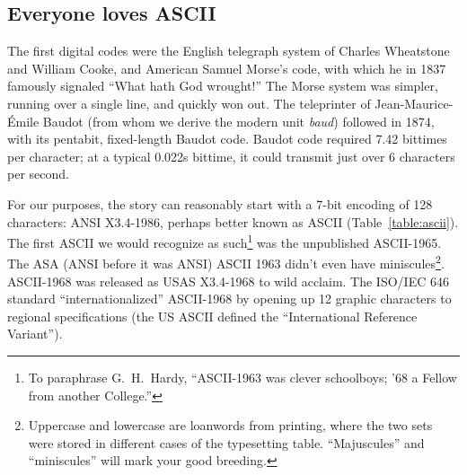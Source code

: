 \subsection{Everyone loves ASCII}
\begin{figure}
\end{figure}
The first digital codes were the English telegraph system of Charles Wheatstone
and William Cooke, and American Samuel Morse's code, with which he in 1837 famously
signaled ``What hath God wrought!'' The Morse system was simpler, running
over a single line, and quickly won out. The teleprinter of Jean-Maurice-Émile Baudot
(from whom we derive the modern unit \textit{baud}) followed in
1874\cite{evolutioncodes}, with its pentabit, fixed-length Baudot code. Baudot
code required 7.42 bittimes per character; at a typical 0.022s bittime, it
could transmit just over 6 characters per second\cite{martin}.

For our purposes, the story can reasonably start with a 7-bit encoding of
128 characters: ANSI X3.4-1986, perhaps better known as ASCII (Table~\ref{table:ascii}).
The first ASCII we would recognize as such\footnote{To paraphrase G.\ H.\
Hardy, ``ASCII-1963 was clever schoolboys; '68 a Fellow from another
College\cite{ghhardy}.''} was the unpublished ASCII-1965. The ASA (ANSI
before it was ANSI) ASCII 1963 didn't even have miniscules\footnote{Uppercase
and lowercase are loanwords from printing, where the two sets were
stored in different cases of the typesetting table. ``Majuscules'' and
``miniscules'' will mark your good breeding.}. ASCII-1968 was
released as USAS X3.4-1968 to wild acclaim. The ISO/IEC 646 standard\cite{iso646}
``internationalized'' ASCII-1968 by opening up 12 graphic characters to
regional specifications (the US ASCII defined the ``International Reference
Variant'')\cite{aivosto}.

